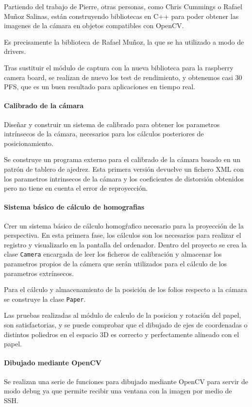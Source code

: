 Partiendo del trabajo de Pierre, otras personas, como Chris Cummings o Rafael Muñoz Salinas, están construyendo bibliotecas en C++ para poder obtener las imagenes de la cámara en objetos compatibles con OpenCV.

Es precisamente la biblioteca de Rafael Muñoz, la que se ha utilizado a modo de drivers. 

Tras sustituir el módulo de captura con la nueva biblioteca para la raspberry camera board, se realizan de nuevo los test de rendimiento, y obtenemos casi 30 PFS, que es un buen resultado para aplicaciones en tiempo real.


\paragraph{Calibrado de la cámara}
Diseñar y construir un sistema de calibrado para obtener los parametros intrínsecos de la cámara, necesarios para los cálculos posteriores de posicionamiento.

Se construye un programa externo para el calibrado de la cámara basado en un patrón de tablero de ajedrez. Esta primera versión devuelve un fichero XML con los parametros intrinsecos de la cámara y los coeficientes de distorsión obtenidos pero no tiene en cuenta el error de reproyección.

\paragraph{Sistema básico de cálculo de homografias} 
Crer un sistema básico de cálculo homogŕafico necesario para la proyección de la perspectiva. En esta primera fase, los cálculos son los necesarios para realizar el registro y visualizarlo en la pantalla del ordenador.
Dentro del proyecto se crea la clase \texttt{Camera} encargada de leer los ficheros de calibración y almacenar los parametros propios de la cámera que serán utilizados para el cálculo de los parametros extrínsecos. 

Para el cálculo y almacenamiento de la posición de los folios respecto a la cámara se construye la clase \texttt{Paper}.

Las pruebas realizadas al módulo de calculo de la posicion y rotación del papel, son satisfactorias, y se puede comprobar que el dibujado de ejes de coordenadas o distintos poliedros en el espacio 3D es correcto y perfectamente alineado con el papel. 

\paragraph{Dibujado mediante OpenCV}
 Se realizan una serie de funciones para dibujado mediante OpenCV para servir de modo debug ya que permite recibir una ventana con la imagen por medio de SSH.

